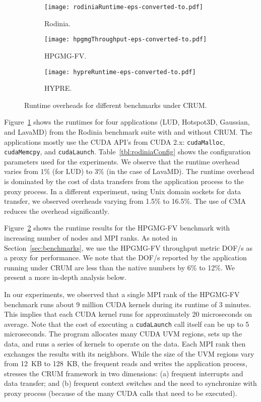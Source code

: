 \documentclass[11pt]{article}
\begin{document}
\begin{figure*}[t!]
  \begin{subfigure}[b]{0.32\textwidth}
    \centering
    \texttt{[image: rodiniaRuntime-eps-converted-to.pdf]}
    \caption{Rodinia. \label{fig:rodiniaRuntime}}
  \end{subfigure}
  \begin{subfigure}[b]{0.32\textwidth}
    \centering
    \texttt{[image: hpgmgThroughput-eps-converted-to.pdf]}
  \caption{HPGMG-FV. \label{fig:hpgmgThroughput}}
  \end{subfigure}
  \begin{subfigure}[b]{0.32\textwidth}
    \centering
    \texttt{[image: hypreRuntime-eps-converted-to.pdf]}
    \caption{HYPRE. \label{fig:hypreRuntime}}
  \end{subfigure}
  \caption{Runtime overheads for different benchmarks under CRUM.}
\end{figure*}

Figure~\ref{fig:rodiniaRuntime} shows the runtimes for four applications (LUD, Hotspot3D,
Gaussian, and LavaMD) from the Rodinia benchmark suite with and without CRUM.
The applications mostly use the CUDA API's from CUDA 2.x: {\tt cudaMalloc}, {\tt
cudaMemcpy}, and {\tt cudaLaunch}. Table~\ref{tbl:rodiniaConfig} shows the
configuration parameters used for the experiments. We observe that the runtime
overhead varies from 1\% (for LUD) to 3\% (in the case of LavaMD). The runtime
overhead is dominated by the cost of data transfers from the application process
to the proxy process. In a different experiment, using Unix domain sockets
for data transfer, we observed overheads varying from 1.5\% to 16.5\%. The use of
CMA reduces the overhead significantly.


Figure~\ref{fig:hpgmgThroughput} shows the runtime results for the HPGMG-FV benchmark with
increasing number of nodes and MPI ranks. As noted in
Section~\ref{sec:benchmarks}, we use the HPGMG-FV throughput metric  DOF/s as a proxy for performance. We note that the DOF/s reported by
the application running under CRUM are less than the native numbers by 6\% to 12\%.
We present a more in-depth analysis below.

In our experiments, we observed that a single MPI rank of the HPGMG-FV benchmark
runs about 9 million CUDA kernels during its runtime of 3 minutes. This implies
that each CUDA kernel runs for approximately 20 microseconds on average. Note that
the cost of executing a {\tt cudaLaunch} call itself can be up to 5 microseconds. The
program allocates many CUDA UVM regions, sets up the data, and runs a series of
kernels to operate on the data. Each MPI rank then exchanges the results with
its neighbors. While the size of the UVM regions vary from 12~KB to 128~KB, the
frequent reads and writes the application process, stresses the CRUM framework
in two dimensions: (a) frequent interrupts and data transfer; and (b) frequent
context switches and the need to synchronize with proxy process (because of the
many CUDA calls that need to be executed).
\end{document}
